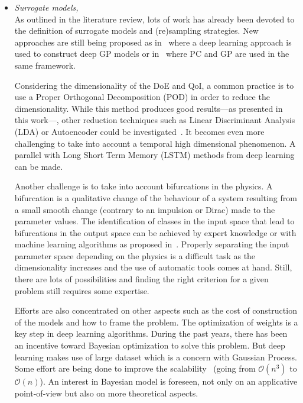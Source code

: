 \begin{itemize}
\item \emph{Surrogate models,}\hfill\\
As outlined in the literature review, lots of work has already been devoted to the definition of surrogate models and (re)sampling strategies. New approaches are still being proposed as in~\cite{raissi2016} where a deep learning approach is used to construct deep GP models or in~\cite{Schoebi2015} where PC and GP are used in the same framework.

Considering the dimensionality of the DoE and QoI, a common practice is to use a Proper Orthogonal Decomposition (POD) in order to reduce the dimensionality. While this method produces good results---as presented in this work---, other reduction techniques such as Linear Discriminant Analysis (LDA) or Autoencoder could be investigated~\cite{Goodfellow2016}. It becomes even more challenging to take into account a temporal high dimensional phenomenon. A parallel with Long Short Term Memory (LSTM) methods from deep learning can be made.

Another challenge is to take into account bifurcations in the physics. A bifurcation is a qualitative change of the behaviour of a system resulting from a small smooth change (contrary to an impulsion or Dirac) made to the parameter values. The identification of classes in the input space that lead to bifurcations in the output space can be achieved by expert knowledge or with  machine learning algorithms as proposed in~\cite{Dupuis2018}. Properly separating the input parameter space depending on the physics is a difficult task as the dimensionality increases and the use of automatic tools comes at hand. Still, there are lots of possibilities and finding the right criterion for a given problem still requires some expertise.

Efforts are also concentrated on other aspects such as the cost of construction of the models and how to frame the problem. The optimization of weights is a key step in deep learning algorithms. During the past years, there has been an incentive toward Bayesian optimization to solve this problem. But deep learning makes use of large dataset which is a concern with Gaussian Process. Some effort are being done to improve the scalability~\cite{Wilson2015} (going from $\mathcal{O}(n^3)$ to $\mathcal{O}(n)$). An interest in Bayesian model is foreseen, not only on an applicative point-of-view but also on more theoretical aspects.


\end{itemize}
